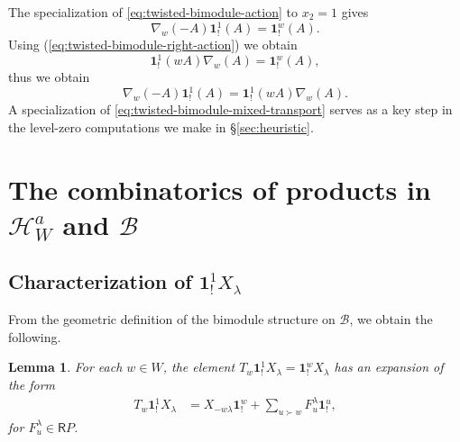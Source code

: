 \documentclass{amsart}
\newcommand{\Ring}{\mathsf{R}}
\newcommand{\bone}{\mathbf{1}}
\newcommand{\Ha}{\mathcal{H}_{W}^a}
\newtheorem{Lem}[Thm]{Lemma}
\theoremstyle{definition}
\numberwithin{equation}{section}
\begin{document}
The specialization of \eqref{eq:twisted-bimodule-action} to
\(x_2=1\) gives
\begin{equation}\label{eq:twisted-bimodule-left-identity-transport}
\nabla_w(-A)\bone_!^1(A)=\bone_!^w(A).
\end{equation}
Using (\ref{eq:twisted-bimodule-right-action}) we obtain
\begin{equation}\label{eq:twisted-bimodule-right-standard-transport}
\bone_!^1(wA)\nabla_w(A)=\bone_!^w(A),
\end{equation}
thus we obtain
\begin{equation}\label{eq:twisted-bimodule-mixed-transport}
\nabla_w(-A)\bone_!^1(A)=\bone_!^1(wA)\nabla_w(A).
\end{equation}
A specialization of \eqref{eq:twisted-bimodule-mixed-transport} serves as a key step in the level-zero computations we make in \S\ref{sec:heuristic}.

\section{The combinatorics of products in $\Ha$ and $\mathcal{B}$}\label{sec:products}

\subsection{Characterization of $\bone_!^1X_\lambda$}

From the geometric definition of the bimodule structure on $\mathcal{B}$, we obtain the following.
\begin{Lem}\label{Lem:star}
     For each $w\in W$, the element $T_w\bone_!^1 X_\lambda=\bone_!^w X_\lambda$ has an expansion of the form
     \begin{align}
         T_w\bone_!^1X_\lambda & = X_{-w\lambda}\bone_!^w+\sum_{u\succ w}F_u^\lambda \bone_!^u,
     \end{align}
     for $F_u^{\lambda} \in \Ring P$.
\end{Lem}
\end{document}

